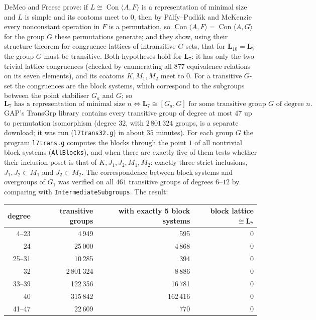\documentclass[11pt]{article}
\theoremstyle{remark}
\newcommand{\Con}{\operatorname{Con}}
\newcommand{\LL}{\mathbf{L}_7}
\begin{document}
DeMeo and Freese \cite[Section on intransitive group actions]{DeMeoFreese} prove: if
$L\cong\Con\langle A,F\rangle$ is a representation of minimal size and $L$ is simple and its
coatoms meet to $0$, then by P\'alfy--Pudl\'ak and McKenzie every nonconstant operation in $F$ is
a permutation, so $\Con\langle A,F\rangle=\Con\langle A,G\rangle$ for the group $G$ these
permutations generate; and they show, using their structure theorem for congruence lattices of
intransitive $G$-sets, that for $\mathbf L_{10}=\LL$ the group $G$ must be transitive.
Both hypotheses hold for $\LL$: it has only the two trivial lattice congruences (checked by
enumerating all $877$ equivalence relations on its seven elements), and its coatoms $K,M_1,M_2$
meet to $0$. For a transitive $G$-set the congruences are the block systems, which correspond to
the subgroups between the point stabiliser $G_a$ and $G$; so
\[
\text{$\LL$ has a representation of minimal size $n$}\iff
\text{$\LL\cong[G_a,G]$ for some transitive group $G$ of degree $n$.}
\]
GAP's TransGrp library \cite{TransGrp} contains every transitive group of degree at most $47$ up to
permutation isomorphism (degree $32$, with $2\,801\,324$ groups, is a separate download; it was
run (\texttt{l7trans32.g}) in about $35$ minutes). For each group $G$ the program
\texttt{l7trans.g} computes the blocks through the point $1$ of all nontrivial block systems
(\texttt{AllBlocks}), and when there are exactly five of them tests whether their inclusion
poset is that of $K,J_1,J_2,M_1,M_2$: exactly three strict inclusions, $J_1,J_2\subset M_1$ and
$J_2\subset M_2$. The correspondence between block systems and overgroups of $G_1$ was
verified on all $461$ transitive groups of degrees $6$--$12$ by comparing with
\texttt{IntermediateSubgroups}. The result:

\begin{center}
\begin{tabular}{rrrr}
\toprule
degree & transitive groups & with exactly 5 block systems & block lattice $\cong\LL$\\
\midrule
4--23 & 4\,949 & 595 & 0\\
24 & 25\,000 & 4\,868 & 0\\
25--31 & 10\,285 & 394 & 0\\
32 & 2\,801\,324 & 8\,886 & 0\\
33--39 & 122\,356 & 16\,781 & 0\\
40 & 315\,842 & 162\,416 & 0\\
41--47 & 22\,609 & 770 & 0\\
\bottomrule
\end{tabular}
\end{center}
\end{document}
